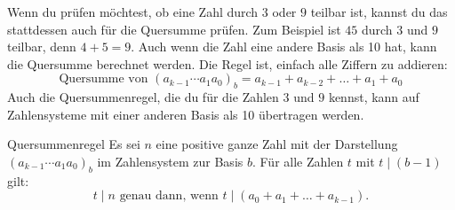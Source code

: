 \documentclass[../../main.tex]{subfiles}
\begin{document}
Wenn du prüfen möchtest, ob eine Zahl durch $3$ oder $9$ teilbar ist, kannst du das stattdessen auch für die Quersumme prüfen. Zum Beispiel ist $45$ durch $3$ und $9$ teilbar, denn $4+5=9$. Auch wenn die Zahl eine andere Basis als 10 hat, kann die Quersumme berechnet werden. Die Regel ist, einfach alle Ziffern zu addieren:
\[\text{Quersumme von }(a_{k-1}\cdots a_1a_0)_b=a_{k-1}+a_{k-2}+\dots+a_1+a_0\]
Auch die Quersummenregel, die du für die Zahlen $3$ und $9$ kennst, kann auf Zahlensysteme mit einer anderen Basis als 10 übertragen werden.
\begin{theorem}{Quersummenregel}
    Es sei $n$ eine positive ganze Zahl mit der Darstellung $(a_{k-1}\cdots a_1a_0)_b$ im Zahlensystem zur Basis $b$. Für alle Zahlen $t$ mit $t\mid (b-1)$ gilt:
    \[t\mid n\text{ genau dann, wenn }t\mid (a_0+a_1+\dots+a_{k-1}).\]
\end{theorem}
\end{document}
